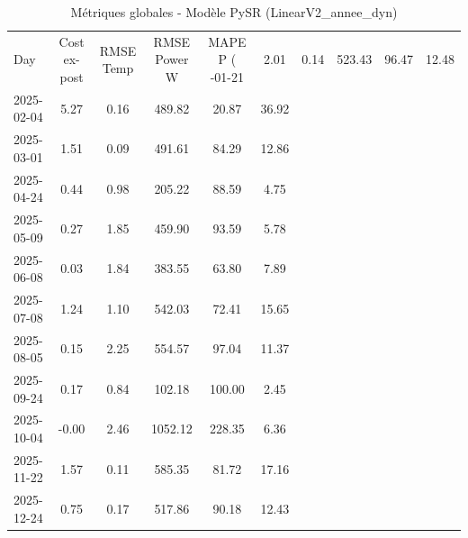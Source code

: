 \begin{table}
\caption{Métriques globales - Modèle PySR (LinearV2_annee_dyn)}
\label{tab:PySR_LinearV2_annee_dyn_Validation_EPlus_sans_Opti}
\begin{small}
\begin{tabular}{lccccc}
\toprule
Day & Cost ex-post & RMSE Temp & RMSE Power W & MAPE P (%
-01-21 & 2.01 & 0.14 & 523.43 & 96.47 & 12.48 \\
2025-02-04 & 5.27 & 0.16 & 489.82 & 20.87 & 36.92 \\
2025-03-01 & 1.51 & 0.09 & 491.61 & 84.29 & 12.86 \\
2025-04-24 & 0.44 & 0.98 & 205.22 & 88.59 & 4.75 \\
2025-05-09 & 0.27 & 1.85 & 459.90 & 93.59 & 5.78 \\
2025-06-08 & 0.03 & 1.84 & 383.55 & 63.80 & 7.89 \\
2025-07-08 & 1.24 & 1.10 & 542.03 & 72.41 & 15.65 \\
2025-08-05 & 0.15 & 2.25 & 554.57 & 97.04 & 11.37 \\
2025-09-24 & 0.17 & 0.84 & 102.18 & 100.00 & 2.45 \\
2025-10-04 & -0.00 & 2.46 & 1052.12 & 228.35 & 6.36 \\
2025-11-22 & 1.57 & 0.11 & 585.35 & 81.72 & 17.16 \\
2025-12-24 & 0.75 & 0.17 & 517.86 & 90.18 & 12.43 \\
\bottomrule
\end{tabular}
\end{small}
\end{table}
